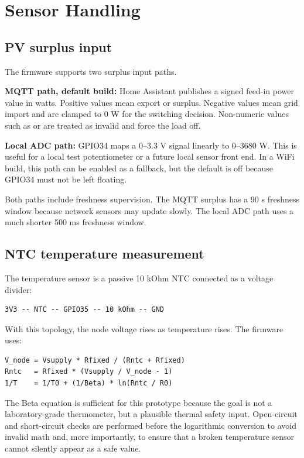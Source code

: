 \documentclass[12pt,a4paper]{article}
\newcommand{\code}[1]{\texttt{\detokenize{#1}}}
\begin{document}
\newpage
\section{Sensor Handling}

\subsection{PV surplus input}

The firmware supports two surplus input paths.

\textbf{MQTT path, default build:} Home Assistant publishes a signed feed-in power
value in watts. Positive values mean export or surplus. Negative values mean grid
import and are clamped to 0 W for the switching decision. Non-numeric values such
as \code{unknown} or \code{unavailable} are treated as invalid and force the load
off.

\textbf{Local ADC path:} GPIO34 maps a 0--3.3 V signal linearly to
0--3680 W. This is useful for a local test potentiometer or a future local sensor
front end. In a WiFi build, this path can be enabled as a fallback, but the default
is off because GPIO34 must not be left floating.

Both paths include freshness supervision. The MQTT surplus has a 90 s freshness
window because network sensors may update slowly. The local ADC path uses a much
shorter 500 ms freshness window.

\subsection{NTC temperature measurement}

The temperature sensor is a passive 10 kOhm NTC connected as a voltage divider:

\begin{lstlisting}
3V3 -- NTC -- GPIO35 -- 10 kOhm -- GND
\end{lstlisting}

With this topology, the node voltage rises as temperature rises. The firmware
uses:

\begin{lstlisting}
V_node = Vsupply * Rfixed / (Rntc + Rfixed)
Rntc   = Rfixed * (Vsupply / V_node - 1)
1/T    = 1/T0 + (1/Beta) * ln(Rntc / R0)
\end{lstlisting}

The Beta equation is sufficient for this prototype because the goal is not a
laboratory-grade thermometer, but a plausible thermal safety input. Open-circuit
and short-circuit checks are performed before the logarithmic conversion to avoid
invalid math and, more importantly, to ensure that a broken temperature sensor
cannot silently appear as a safe value.
\end{document}
